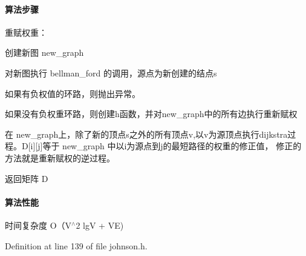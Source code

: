 \paragraph*{算法步骤}


\begin{DoxyItemize}
\item 重赋权重：
\begin{DoxyItemize}
\item 创建新图 new\+\_\+graph
\item 对新图执行 bellman\+\_\+ford 的调用，源点为新创建的结点s
\item 如果有负权值的环路，则抛出异常。
\item 如果没有负权重环路，则创建h函数，并对new\+\_\+graph中的所有边执行重新赋权
\end{DoxyItemize}
\item 在 new\+\_\+graph上，除了新的顶点s之外的所有顶点v,以v为源顶点执行dijkstra过程。\+D\mbox{[}i\mbox{]}\mbox{[}j\mbox{]}等于 new\+\_\+graph 中以i为源点到j的最短路径的权重的修正值， 修正的方法就是重新赋权的逆过程。
\item 返回矩阵 D
\end{DoxyItemize}

\paragraph*{算法性能}

时间复杂度 O（\+V$^\wedge$2 lg\+V + V\+E) 

Definition at line 139 of file johnson.\+h.

\hypertarget{namespace_introduction_to_algorithm_1_1_graph_algorithm_a2575c09c42d0b30b57702c9379d2fbfb}{}
